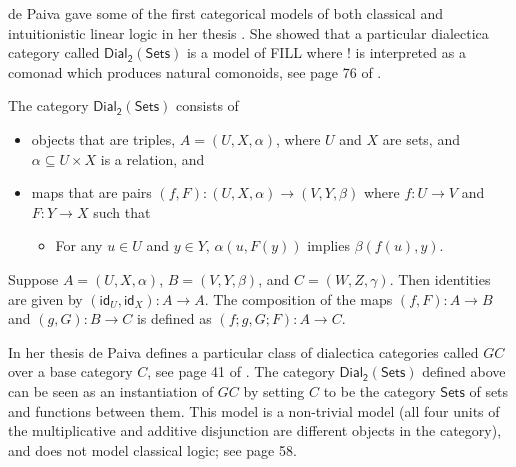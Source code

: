 \documentclass{elsarticle}
\newcommand{\dial}[0]{\mathsf{Dial_2}(\mathsf{Sets})}
\newcommand{\sets}[0]{\mathsf{Sets}}
\newcommand{\id}[0]{\mathsf{id}}
\begin{document}
de Paiva gave some of the first categorical models of both classical
and intuitionistic linear logic in her thesis \cite{dePaiva:1988}. She
showed that a particular dialectica category called $\dial$ is a model
of FILL where $!$ is interpreted as a comonad which produces natural
comonoids, see page 76 of \cite{dePaiva:1988}.
\begin{definition}
  \label{def:dial2sets}
  The category $\dial$ consists of 
  \begin{itemize}
  \item objects that are triples, $A = (U,X,\alpha)$, where $U$ and
    $X$ are sets, and $\alpha \subseteq U \times X$ is a relation, and
  \item maps that are pairs $(f,F) : (U,X,\alpha) \to (V,Y,\beta)$
    where $f : U \to V$ and $F : Y \to X$ such that
    \begin{itemize}
    \item For any $u \in U$ and $y \in Y$, $\alpha(u,F(y))$ implies $\beta(f(u),y)$.
    \end{itemize}
  \end{itemize}
  Suppose $A = (U,X,\alpha)$, $B = (V,Y,\beta)$, and
  $C = (W,Z,\gamma)$.  Then identities are given by
  $(\id_U,\id_X) : A \to A$.  The composition of the maps
  $(f,F) : A \to B$ and $(g, G) : B \to C$ is defined as
  $(f;g,G;F) : A \to C$.
\end{definition}
In her thesis de Paiva defines a particular class of dialectica
categories called $GC$ over a base category $C$, see page 41 of
\cite{dePaiva:1988}.  The category $\dial$ defined above can be seen
as an instantiation of $GC$ by setting $C$ to be the category $\sets$
of sets and functions between them.  This model is a non-trivial model
(all four units of the multiplicative and additive disjunction are
different objects in the category), and does not model classical
logic; see \cite{dePaiva:1988} page 58.
\end{document}
